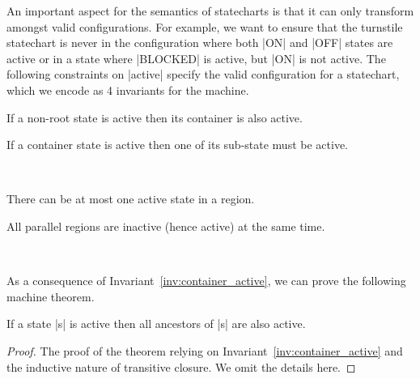 An important aspect for the semantics of statecharts is that it can only transform amongst valid configurations.  For example, we want to ensure that the turnstile statechart is never in the configuration where both |ON| and |OFF| states are active or in a state where |BLOCKED| is active, but |ON| is not active. The following constraints on |active| specify the valid configuration for a statechart, which we encode as 4 invariants for the machine.
\begin{invariant}
\label{inv:container_active}
If a non-root state is active then its container is also active.
\begin{center}
\end{center}
\end{invariant}
\begin{invariant}
\label{inv:content_active}
If a container state is active then one of its sub-state must be active.
\begin{center}
\\
\end{center}
\end{invariant}
\begin{invariant}
\label{inv:active-region-unique}
There can be at most one active state in a region.
\begin{center}
\end{center}
\end{invariant}
\begin{invariant}
\label{inv:active-region-parallel}
All parallel regions are inactive (hence active) at the same time.
\begin{center}
 \\
\end{center}
\end{invariant}
As a consequence of Invariant~\ref{inv:container_active}, we can prove the following machine theorem.
\begin{theorem}
\label{thm:@ancestor_active}
If a state |s| is active then all ancestors of |s| are also active.
\begin{center}
\end{center}
\end{theorem}
\begin{proof}
The proof of the theorem relying on Invariant~\ref{inv:container_active} and the inductive nature of transitive closure. We omit the details here.
\end{proof}

